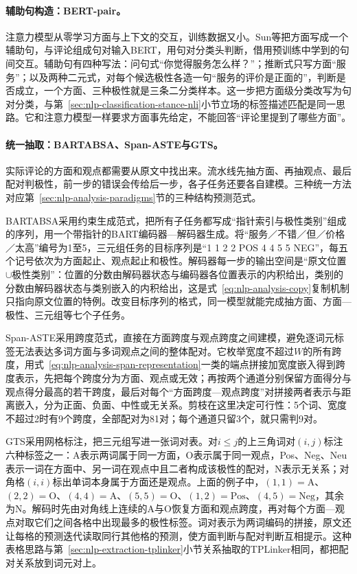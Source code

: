 \paragraph{辅助句构造：BERT-pair。}注意力模型从零学习方面与上下文的交互，训练数据又小。Sun等把方面写成一个辅助句，与评论组成句对输入BERT，用句对分类头判断，借用预训练中学到的句间交互。辅助句有四种写法：问句式“你觉得服务怎么样？”；推断式只写方面“服务”；以及两种二元式，对每个候选极性各造一句“服务的评价是正面的”，判断是否成立，一个方面、三种极性就是三条二分类样本。这一步把方面级分类改写为句对分类，与第~\ref{sec:nlp-classification-stance-nli}小节立场的标签描述匹配是同一思路。它和注意力模型一样要求方面事先给定，不能回答“评论里提到了哪些方面”。

\paragraph{统一抽取：BARTABSA、Span-ASTE与GTS。}实际评论的方面和观点都需要从原文中找出来。流水线先抽方面、再抽观点、最后配对判极性，前一步的错误会传给后一步，各子任务还要各自建模。三种统一方法对应第~\ref{sec:nlp-analysis-paradigms}节的三种结构预测范式。

BARTABSA采用约束生成范式，把所有子任务都写成“指针索引与极性类别”组成的序列，用一个带指针的BART编码器—解码器生成。将“服务／不错／但／价格／太高”编号为1至5，三元组任务的目标序列是“1 1 2 2 POS 4 4 5 5 NEG”，每五个记号依次为方面起止、观点起止和极性。解码器每一步的输出空间是“原文位置$\cup$极性类别”：位置的分数由解码器状态与编码器各位置表示的内积给出，类别的分数由解码器状态与类别嵌入的内积给出，这是式~\eqref{eq:nlp-analysis-copy}复制机制只指向原文位置的特例。改变目标序列的格式，同一模型就能完成抽方面、方面—极性、三元组等七个子任务。

Span-ASTE采用跨度范式，直接在方面跨度与观点跨度之间建模，避免逐词元标签无法表达多词方面与多词观点之间的整体配对。它枚举宽度不超过$W$的所有跨度，用式~\eqref{eq:nlp-analysis-span-representation}一类的端点拼接加宽度嵌入得到跨度表示，先把每个跨度分为方面、观点或无效；再按两个通道分别保留方面得分与观点得分最高的若干跨度，最后对每个“方面跨度—观点跨度”对拼接两者表示与距离嵌入，分为正面、负面、中性或无关系。剪枝在这里决定可行性：5个词、宽度不超过2时有9个跨度，全部配对为81对；每个通道只留3个，就只需判9对。

GTS采用网格标注，把三元组写进一张词对表。对$i\leq j$的上三角词对$(i,j)$标注六种标签之一：A表示两词属于同一方面，O表示属于同一观点，Pos、Neg、Neu表示一词在方面中、另一词在观点中且二者构成该极性的配对，N表示无关系；对角格$(i,i)$标出单词本身属于方面还是观点。上面的例子中，$(1,1)=\mathrm A$、$(2,2)=\mathrm O$、$(4,4)=\mathrm A$、$(5,5)=\mathrm O$、$(1,2)=\mathrm{Pos}$、$(4,5)=\mathrm{Neg}$，其余为N。解码时先由对角线上连续的A与O恢复方面和观点跨度，再对每个方面—观点对取它们之间各格中出现最多的极性标签。词对表示为两词编码的拼接，原文还让每格的预测迭代读取同行其他格的预测，使方面判断与配对判断互相提示。这种表格思路与第~\ref{sec:nlp-extraction-tplinker}小节关系抽取的TPLinker相同，都把配对关系放到词元对上。

